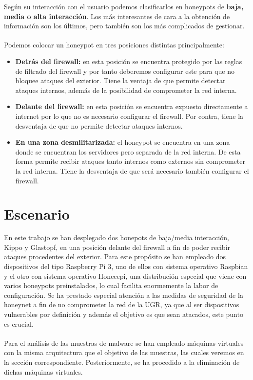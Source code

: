 \documentclass[journal]{IEEEtran}
\begin{document}
Según su interacción con el usuario podemos clasificarlos en honeypots de \textbf{baja, media o alta interacción}. Los más interesantes de cara a la obtención de información son los últimos, pero también son los más complicados de gestionar.
\\\\
Podemos colocar un honeypot en tres posiciones distintas principalmente:
\begin{itemize}
\item\textbf{Detrás del firewall:} en esta posición se encuentra protegido por las reglas de filtrado del firewall y por tanto deberemos configurar este para que no bloquee ataques del exterior. Tiene la ventaja de que permite detectar ataques internos, además de la posibilidad de comprometer la red interna.
\item \textbf{Delante del firewall:} en esta posición se encuentra expuesto directamente a internet por lo que no es necesario configurar el firewall. Por contra, tiene la desventaja de que no permite detectar ataques internos.
\item \textbf{En una zona desmilitarizada:} el honeypot se encuentra en una zona donde se encuentran los servidores pero separada de la red interna. De esta forma permite recibir ataques tanto internos como externos sin comprometer la red interna. Tiene la desventaja de que será necesario también configurar el firewall.
\end{itemize}
\section{Escenario}
En este trabajo se han desplegado dos honepots de baja/media interacción, Kippo y Glastopf, en una posición delante del firewall a fin de poder recibir ataques procedentes del exterior. Para este propósito se han empleado dos dispositivos del tipo Raspberry Pi 3, uno de ellos con sistema operativo Raspbian y el otro con sistema operativo Honeeepi, una distribución especial que viene con varios honeypots preinstalados, lo cual facilita enormemente la labor de configuración. Se ha prestado especial atención a las medidas de seguridad de la honeynet a fin de no comprometer la red de la UGR, ya que al ser dispositivos vulnerables por definición y además el objetivo es que sean atacados, este punto es crucial.
\\\\
Para el análisis de las muestras de malware se han empleado máquinas virtuales con la misma arquitectura que el objetivo de las muestras, las cuales veremos en la sección correspondiente. Posteriormente, se ha procedido a la eliminación de dichas máquinas virtuales.
\end{document}
